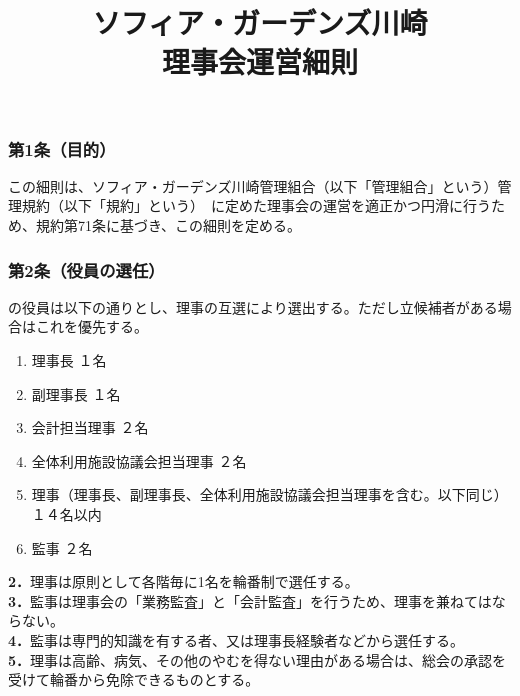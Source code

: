 \documentclass[12pt,uplatex]{jsarticle}
\title{ソフィア・ガーデンズ川崎 \\  理事会運営細則}
\begin{document}
\maketitle
\tableofcontents
\clearpage
\addtocounter{page}{-1}
\pagestyle{plain}

\subsubsection*{ 第1条（目的）}
この細則は、ソフィア・ガーデンズ川崎管理組合（以下「管理組合」という）管理規約（以下「規約」という）\
に定めた理事会の運営を適正かつ円滑に行うため、規約第71条に基づき、この細則を定める。

\subsubsection*{ 第2条（役員の選任）}
の役員は以下の通りとし、理事の互選により選出する。ただし立候補者がある場合はこれを優先する。
\begin{enumerate}
\item 理事長				１名
\item 副理事長				１名
\item 会計担当理事				２名
\item 全体利用施設協議会担当理事		２名
\item 理事（理事長、副理事長、全体利用施設協議会担当理事を含む。以下同じ） １４名以内
\item 監事    ２名
\end{enumerate}
\textbf{2．}理事は原則として各階毎に1名を輪番制で選任する。\\
\textbf{3．}監事は理事会の「業務監査」と「会計監査」を行うため、理事を兼ねてはならない。\\
\textbf{4．}監事は専門的知識を有する者、又は理事長経験者などから選任する。\\
\textbf{5．}理事は高齢、病気、その他のやむを得ない理由がある場合は、総会の承認を受けて輪番から免除できるものとする。\\
\end{document}

